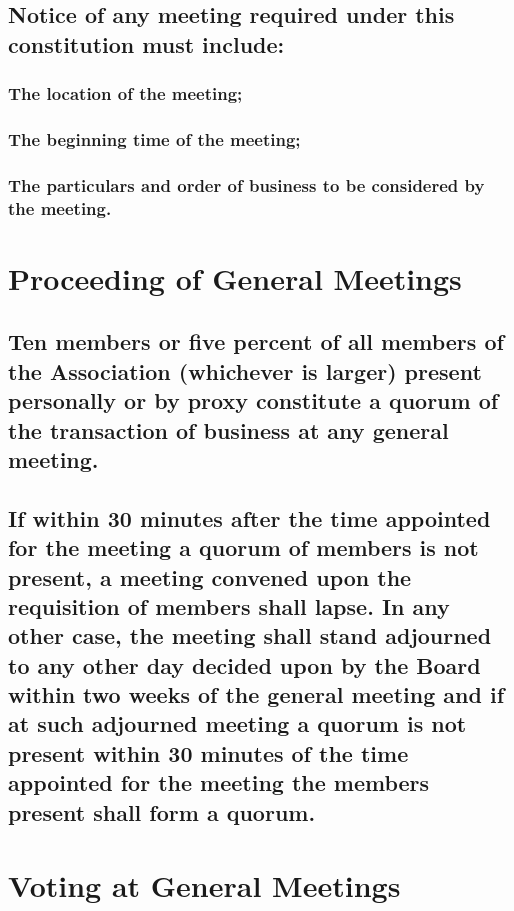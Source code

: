 \documentclass{article}
\newenvironment{subs}
  {\adjustwidth{2em}{0pt}}
  {\endadjustwidth}
\begin{document}
\begin{subs}
\begin{subs}
\begin{subs}
\subsection{Notice of any meeting required under this constitution must include:}
\begin{subs}
\subsubsection{The location of the meeting;}

\subsubsection{The beginning time of the meeting;}
\subsubsection{The particulars and order of business to be considered by the meeting.}
\end{subs}
\end{subs}

\section{Proceeding of General Meetings}
\begin{subs}
\subsection{Ten members or five percent of all members of the Association (whichever is larger) present personally or by proxy constitute a quorum of the transaction of business at any general meeting.}
\subsection{If within 30 minutes after the time appointed for the meeting a quorum of members is not present, a meeting convened upon the requisition of members shall lapse. In any other case, the meeting shall stand adjourned to any other day decided upon by the Board within two weeks of the general meeting and if at such adjourned meeting a quorum is not present within 30 minutes of the time appointed for the meeting the members present shall form a quorum.}
\end{subs}

\section{Voting at General Meetings}
\begin{subs}

\end{subs}
\end{subs}
\end{subs}
\end{document}
